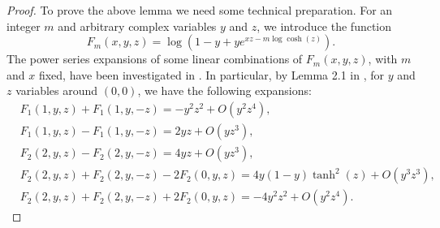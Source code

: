 \documentclass[11pt,oneside]{amsart}
\numberwithin{equation}{section}  %
\theoremstyle{plain}
\theoremstyle{remark}
\begin{document}
\begin{proof}
To prove the above lemma we need some technical preparation. 
For an integer $m$ and arbitrary complex variables $y$ and $z$, we introduce the function
\begin{equation*}
F_m(x,y,z) = \log \left(1-y+ye^{xz - m \log \cosh(z)}\right).
\end{equation*}
The power series expansions of some linear combinations of $F_m(x,y,z)$, 
with $m$ and $x$ fixed, have been investigated in \cite{KLS20}. 
In particular, by Lemma 2.1 in \cite{KLS20}, for $y$ and $z$ variables around $(0,0)$,
we have the following expansions:
\begin{equation}\label{lemma:Fcomb}
\begin{split}
& F_1(1,y,z) + F_1(1,y,-z) = -y^2 z^2 + O(y^2z^4), \\
& F_1(1,y,z) - F_1(1,y,-z) = 2yz + O(yz^3), \\
& F_2(2,y,z) - F_2(2,y,-z) = 4yz + O(yz^3), \\
& F_2(2,y,z) + F_2(2,y,-z) - 2F_2(0,y,z) = 4y(1-y) \tanh^2(z) + O(y^3z^3), \\
& F_2(2,y,z) + F_2(2,y,-z) + 2F_2(0,y,z) = -4y^2z^2 + O(y^2z^4).
\end{split}
\end{equation}


\end{proof}
\end{document}
